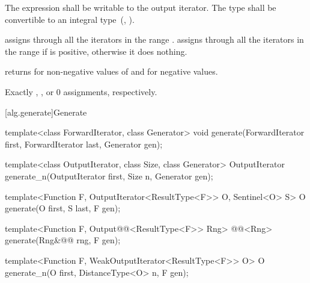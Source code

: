 \begin{itemdescr}
\begin{removedblock}
\pnum
\requires
The expression
shall be writable to the output iterator. The type
shall be convertible to an integral type~(, ).
\end{removedblock}

\pnum
\effects
{} assigns  through all the
iterators in the range . 
assigns  through all the iterators in the range 
if  is positive, otherwise it does nothing.

\pnum
\returns {} returns 
for non-negative values of  and  for negative values.

\pnum
\complexity
Exactly
,
, or 0 assignments, respectively.
\end{itemdescr}

[alg.generate]{Generate}

%
%
\begin{removedblock}
\begin{itemdecl}
template<class ForwardIterator, class Generator>
  void generate(ForwardIterator first, ForwardIterator last,
                Generator gen);

template<class OutputIterator, class Size, class Generator>
  OutputIterator generate_n(OutputIterator first, Size n, Generator gen);
\end{itemdecl}
\end{removedblock}
\begin{addedblock}
\begin{itemdecl}
template<Function F, OutputIterator<ResultType<F>> O,
    Sentinel<O> S>
  O generate(O first, S last, F gen);

template<Function F, Output@@<ResultType<F>> Rng>
  @@<Rng>
    generate(Rng&@\newtxt{\&}@ rng, F gen);

template<Function F, WeakOutputIterator<ResultType<F>> O>
  O generate_n(O first, DistanceType<O> n, F gen);
\end{itemdecl}
\end{addedblock}

